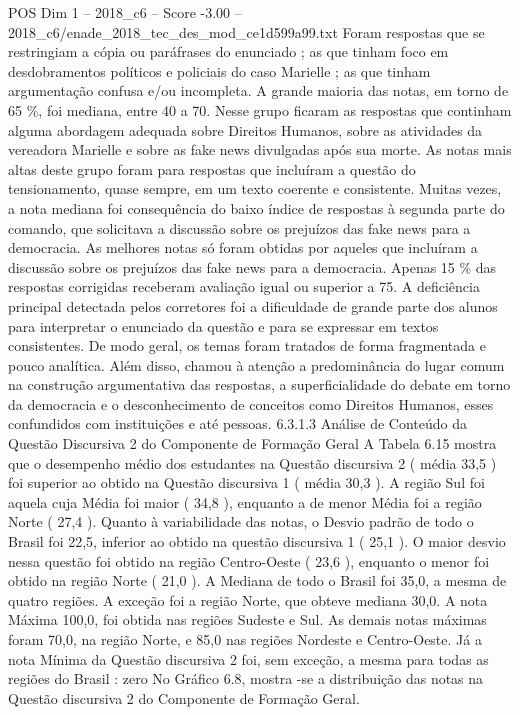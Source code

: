 \begin{textsample}{POS Dim 1 – 2018\_c6 – Score -3.00 – 2018\_c6/enade\_2018\_tec\_des\_mod\_ce1d599a99.txt}
Foram respostas que se restringiam a cópia ou paráfrases do enunciado ; as que tinham foco em desdobramentos políticos e policiais do caso Marielle ; as que tinham argumentação confusa e/ou incompleta.
A grande maioria das notas, em torno de 65 \%, foi mediana, entre 40 a 70.
Nesse grupo ficaram as respostas que continham alguma abordagem adequada sobre Direitos Humanos, sobre as atividades da vereadora Marielle e sobre as fake news divulgadas após sua morte.
As notas mais altas deste grupo foram para respostas que incluíram a questão do tensionamento, quase sempre, em um texto coerente e consistente.
Muitas vezes, a nota mediana foi consequência do baixo índice de respostas à segunda parte do comando, que solicitava a discussão sobre os prejuízos das fake news para a democracia.
As melhores notas só foram obtidas por aqueles que incluíram a discussão sobre os prejuízos das fake news para a democracia.
Apenas 15 \% das respostas corrigidas receberam avaliação igual ou superior a 75.
A deficiência principal detectada pelos corretores foi a dificuldade de grande parte dos alunos para interpretar o enunciado da questão e para se expressar em textos consistentes.
De modo geral, os temas foram tratados de forma fragmentada e pouco analítica.
Além disso, chamou à atenção a predominância do lugar comum na construção argumentativa das respostas, a superficialidade do debate em torno da democracia e o desconhecimento de conceitos como Direitos Humanos, esses confundidos com instituições e até pessoas. 6.3.1.3 Análise de Conteúdo da Questão Discursiva 2 do Componente de Formação Geral A Tabela 6.15 mostra que o desempenho médio dos estudantes na Questão discursiva 2 ( média 33,5 ) foi superior ao obtido na Questão discursiva 1 ( média 30,3 ).
A região Sul foi aquela cuja Média foi maior ( 34,8 ), enquanto a de menor Média foi a região Norte ( 27,4 ).
Quanto à variabilidade das notas, o Desvio padrão de todo o Brasil foi 22,5, inferior ao obtido na questão discursiva 1 ( 25,1 ).
O maior desvio nessa questão foi obtido na região Centro-Oeste ( 23,6 ), enquanto o menor foi obtido na região Norte ( 21,0 ).
A Mediana de todo o Brasil foi 35,0, a mesma de quatro regiões.
A exceção foi a região Norte, que obteve mediana 30,0.
A nota Máxima 100,0, foi obtida nas regiões Sudeste e Sul.
As demais notas máximas foram 70,0, na região Norte, e 85,0 nas regiões Nordeste e Centro-Oeste.
Já a nota Mínima da Questão discursiva 2 foi, sem exceção, a mesma para todas as regiões do Brasil : zero No Gráfico 6.8, mostra -se a distribuição das notas na Questão discursiva 2 do Componente de Formação Geral.

\end{textsample}
